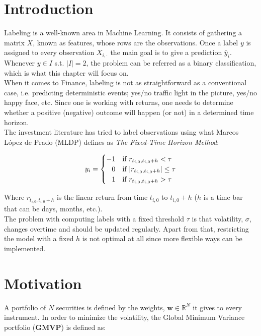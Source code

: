 \documentclass[a4paper]{article}
\begin{document}
\newpage\null\thispagestyle{empty}\newpage

\section{Introduction}
\label{sec:intro}
Labeling is a well-known area in Machine Learning. It consists of 
gathering a matrix $X$, known as features, whose rows are the 
observations. Once a label $y$ is assigned to every observation $X_{i,
\cdot}$ the main goal is to give a prediction $\hat{y}_i$. Whenever $y 
\in I$ s.t. $|I| = 2$, the problem can be referred as a binary 
classification, which is what this chapter will focus on. \\

When it comes to Finance, labeling is not as straightforward as a 
conventional case, i.e. predicting deterministic events; yes/no 
traffic light in the picture, yes/no happy face, etc. Since one is 
working with returns, one needs to determine whether a positive 
(negative) outcome will happen (or not) in a determined time horizon. 
\\

The investment literature has tried to label observations using what 
Marcos López de Prado (MLDP) \cite{AdvFML} defines as \textit{The 
Fixed-Time Horizon Method}:

\begin{equation}
	y_i =
    \begin{cases}
      -1 & \text{if}\ r_{t_{i, 0}, t_{i, 0} + h} < \tau \\
      \hfill 0 & \text{if}\ |r_{t_{i, 0}, t_{i, 0} + h}| \leq \tau \\
      \hfill 1 & \text{if}\ r_{t_{i, 0}, t_{i, 0} + h} > \tau
    \end{cases}
\end{equation}

Where $r_{t_{i, 0}, t_{i, 0} + h}$ is the linear return from time 
$t_{i, 0}$ to $t_{i, 0} + h$ ($h$ is a time bar that can be days, 
months, etc.).\\

The problem with computing labels with a fixed threshold $\tau$ is 
that volatility, $\sigma$, changes overtime and should be updated 
regularly. Apart from that, restricting the model with a fixed $h$ is 
not optimal at all since more flexible ways can be implemented.

\section{Motivation}
\label{sec:motiv}
A portfolio of $N$ securities is defined by the weights, $\textbf{w} 
\in \mathbb{R}^N$ it gives to every instrument. In order to minimize 
the volatility, the Global Minimum Variance portfolio (\textbf{GMVP}) 
is defined as:
\end{document}
